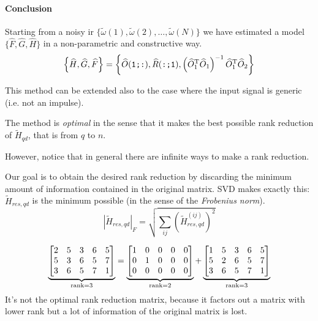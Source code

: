 \paragraph{Conclusion} Starting from a noisy \gls{ir} $\{\widetilde{\omega}(1), \widetilde{\omega}(2), \ldots, \widetilde{\omega}(N)\}$ we have estimated a model $\{\hat{F}, \hat{G}, \hat{H}\}$ in a non-parametric and constructive way.
\[ \left\{\widehat{H}, \widehat{G}, \widehat{F} \right\} = \left \{\widehat{O}(\texttt{1;:}), \widehat{R}(\texttt{:;1}), \left(\widehat{O}_1^{\mathrm{T}}\widehat{O}_1\right)^{-1} \widehat{O}_1^{\mathrm{T}}\widehat{O}_2\right \}\]

\begin{obs}
    This method can be extended also to the case where the input signal is generic (i.e. not an impulse).
\end{obs}

\begin{remark}
    The method is \emph{optimal} in the sense that it makes the best possible rank reduction of $\tilde{H}_{qd}$, that is from $q$ to $n$.
    
    However, notice that in general there are infinite ways to make a rank reduction.
\end{remark}

\begin{remark}
Our goal is to obtain the desired rank reduction by discarding the minimum amount of information contained in the original matrix.
SVD makes exactly this: $\tilde{H}_{res,qd}$ is the minimum possible (in the sense of the \emph{Frobenius norm}).
\[
    \left|\tilde{H}_{res,qd}\right|_F = \sqrt{\sum_{ij} \left(\tilde{H}_{res,qd}^{(ij)} \right)^2}
\]
    
\end{remark}

\begin{example}
    \[
        \underbrace{\begin{bmatrix}
            2 & 5 & 3 & 6 & 5 \\
            5 & 3 & 6 & 5 & 7 \\
            3 & 6 & 5 & 7 & 1
        \end{bmatrix}}_{\operatorname*{rank} = 3}
        =
        \underbrace{\begin{bmatrix}
            1 & 0 & 0 & 0 & 0 \\
            0 & 1 & 0 & 0 & 0 \\
            0 & 0 & 0 & 0 & 0
        \end{bmatrix}}_{\operatorname*{rank} = 2}
        +
        \underbrace{
        \begin{bmatrix}
            1 & 5 & 3 & 6 & 5 \\
            5 & 2 & 6 & 5 & 7 \\
            3 & 6 & 5 & 7 & 1
        \end{bmatrix}}_{\operatorname*{rank} = 3}
    \]
    It's not the optimal rank reduction matrix, because it factors out a matrix with lower rank but a lot of information of the original matrix is lost.
\end{example}



